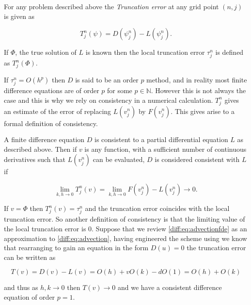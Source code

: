 \documentclass[../main.tex]{subfiles}
\begin{document}
  \begin{definition}
    For any problem described above the \emph{Truncation error} at any grid point $(n, j)$ is given as

    \begin{equation}
      T^n_j(\psi) = D(\psi^n_j) - L(\psi^n_j).
    \end{equation}

    If $\Phi$, the true solution of $L$ is known then the local truncation error $\tau^n_j$ is defined as $T^n_j(\Phi)$.
  \end{definition}

  If $\tau^n_j = O(h^p)$ then $D$ is said to be an order $p$ method, and in reality most finite difference equations are of order $p$ for some $p \in \mathbb{N}$. However this is not always the case and this is why we rely on consistency in a numerical calculation. $T^n_j$ gives an estimate of the error of replacing $L(v^n_j)$ by $F(v^n_j)$. This gives arise to a formal definition of consistency.

  \begin{definition}[Consistency]
    A finite difference equation $D$ is consistent to a partial differential equation $L$ as described above. Then if $v$ is any function, with a sufficient number of continuous derivatives such that $L(v^n_j)$ can be evaluated, $D$ is considered consistent with $L$ if

    \begin{equation}
      \lim_{k, h \to 0} T^n_j(v) = \lim_{k, h \to 0} F(v^n_j) - L(v^n_j) \to 0.
    \end{equation}
  \end{definition}

  If $v = \Phi$ then $T^n_j(v) = \tau^n_j$ and the truncation error coincides with the local truncation error. So another definition of consistency is that the limiting value of the local truncation error is $0$. Suppose that we review \autoref{diff:eq:advectionfde} as an approximation to \autoref{diff:eq:advection}, having engineered the scheme using \cite{fornberg1988} we know that rearranging to gain an equation in the form $D(u) = 0$ the truncation error can be written as

  \begin{equation}
    T(v) = D(v) - L(v) = O(h) + v O(k) - d O(1) = O(h) + O(k)
  \end{equation}

  and thus as $h, k \to 0$ then $T(v) \to 0$ and we have a consistent difference equation of order $p = 1$.
\end{document}

